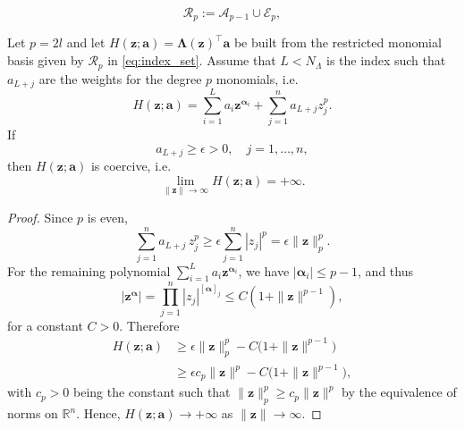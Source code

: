 \documentclass[10pt,a4paper]{amsart}
\begin{document}
\begin{equation}
    \mathcal R_p:=\mathcal A_{p-1}\cup \mathcal E_p,
    \label{eq:index_set}
\end{equation}

\begin{theorem}\label{thm:coercivity}
Let \(p=2l\) and let \(H(\mathbf{z};\mathbf{a})=\boldsymbol{\Lambda}(\mathbf{z})^\top \mathbf{a}\) be built from the
restricted monomial basis given by $\mathcal R_p$ in \eqref{eq:index_set}. Assume that $L<N_{\Lambda}$ is the index such that  $a_{L+j}$ are the weights for the degree $p$ monomials, i.e. 
\[
H(\mathbf{z};\mathbf{a})= \sum_{i=1}^L a_i\mathbf{z}^{\boldsymbol{\alpha}_i} + \sum_{j=1}^{n} a_{L+j} z_j^p.
\]
If 
\begin{equation}
a_{L+j}\ge \epsilon >0, \quad j=1,\dots,n,
\label{eq:coercivity_constraint}
\end{equation}
then \(H(\mathbf{z};\mathbf{a})\) is coercive, i.e.
\[
\lim_{\|\mathbf{z}\|\to\infty} H(\mathbf{z};\mathbf{a})=+\infty.
\]
\end{theorem}

\begin{proof}
Since \(p\) is even,
\[
\sum_{j=1}^n a_{L+j}\, z_j^p
\ge
\epsilon \sum_{j=1}^n |z_j|^p
=
\epsilon \|\mathbf{z}\|_{p}^{p} .
\]
For the remaining polynomial
\(\sum_{i=1}^L a_i\mathbf{z}^{\boldsymbol{\alpha}_i}\),
we have $|\boldsymbol{\alpha}_i| \leq p-1$, and thus
\[
|\mathbf{z}^{\boldsymbol{\alpha}}|
=
\prod_{j=1}^n |z_j|^{[\boldsymbol{\alpha}]_j}
\le
C(1+\|\mathbf{z}\|^{p-1}),
\]
for a constant $C>0$. Therefore
\begin{align*}
H(\mathbf{z};\mathbf{a})
&\ge
\epsilon \|\mathbf{z}\|_p^{p} - C\bigl(1+\|\mathbf{z}\|^{p-1}\bigr)\\
&\ge \epsilon c_p \|\mathbf{z}\|^p - C\bigl(1+\|\mathbf{z}\|^{p-1}\bigr),
\end{align*}
with \(c_p>0\) being the constant such that \(\|\mathbf{z}\|_p^p \ge c_p \|\mathbf{z}\|^p\) by the equivalence of norms on \(\mathbb R^n\).
Hence, 
\(H(\mathbf{z};\mathbf{a})\to +\infty\)
as \(\|\mathbf{z}\|\to\infty\).
\end{proof}
\end{document}
